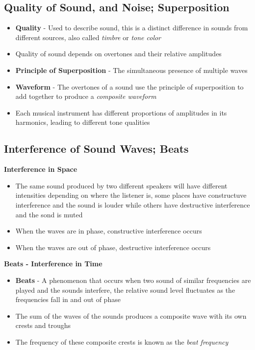 \subsection{Quality of Sound, and Noise; Superposition}
\begin{itemize}
    \item \textbf{Quality} - Used to describe sound, this is a distinct difference in sounds from different sources, also called \emph{timbre} or \emph{tone color}
    \item Quality of sound depends on overtones and their relative amplitudes
    \item \textbf{Principle of Superposition} - The simultaneous presence of multiple waves
    \item \textbf{Waveform} - The overtones of a sound use the principle of superposition to add together to produce a \emph{composite waveform}
    \item Each musical instrument has different proportions of amplitudes in its harmonics, leading to different tone qualities
\end{itemize}

\subsection{Interference of Sound Waves; Beats}
\textbf{Interference in Space} 
\begin{itemize}
    \item The same sound produced by two different speakers will have different intensities depending on where the listener is, some places have constructuve interference and the sound is louder while others have destructive interference and the sond is muted
    \item When the waves are in phase, constructive interference occurs
    \item When the waves are out of phase, destructive interference occurs 
\end{itemize}

\textbf{Beats - Interference in Time}
\begin{itemize}
    \item \textbf{Beats} - A phenomenon that occurs when two sound of similar frequencies are played and the sounds interfere, the relative sound level fluctuates as the frequencies fall in and out of phase
    \item The sum of the waves of the sounds produces a composite wave with its own crests and troughs
    \item The frequency of these composite crests is known as the \emph{beat frequency}
    
\end{itemize}

